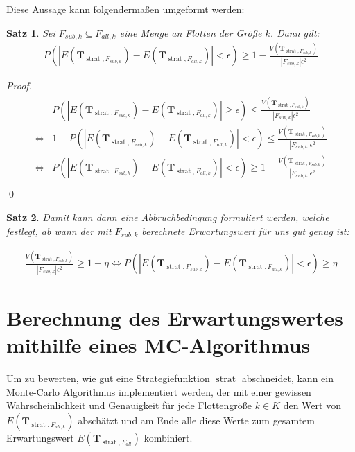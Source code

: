 \documentclass[a4paper,12pt]{llncs}
\numberwithin{equation}{section}
\newtheorem{satz}{Satz}
\DeclareMathOperator{\strat}{strat}
\begin{document}
Diese Aussage kann folgendermaßen umgeformt werden:

\begin{satz}
Sei $F_{sub,k} \subseteq F_{all,k}$ eine Menge an Flotten der Größe $k$.
Dann gilt:
\begin{align}
P(|E(\mathbf{T}_{\strat,F_{sub,k}}) - E(\mathbf{T}_{\strat,F_{all,k}})| < \epsilon) \geq 1 - \frac{V(\mathbf{T}_{\strat,F_{sub,k}})}{|F_{sub,k}| \epsilon^2}
\nonumber
\end{align}
\end{satz}

\begin{proof}
\begin{align}
\begin{split}
&P(|E(\mathbf{T}_{\strat,F_{sub,k}}) - E(\mathbf{T}_{\strat,F_{all,k}})| \geq \epsilon) \leq \frac{V(\mathbf{T}_{\strat,F_{sub,k}})}{|F_{sub,k}| \epsilon^2}\\
\Leftrightarrow &1 - P(|E(\mathbf{T}_{\strat,F_{sub,k}}) - E(\mathbf{T}_{\strat,F_{all,k}})| < \epsilon) \leq \frac{V(\mathbf{T}_{\strat,F_{sub,k}})}{|F_{sub,k}| \epsilon^2}\\
\Leftrightarrow &P(|E(\mathbf{T}_{\strat,F_{sub,k}}) - E(\mathbf{T}_{\strat,F_{all,k}})| < \epsilon) \geq 1 - \frac{V(\mathbf{T}_{\strat,F_{sub,k}})}{|F_{sub,k}| \epsilon^2}\\
\end{split}
\end{align}
\qed
\end{proof}

\begin{satz}
Damit kann dann eine Abbruchbedingung formuliert werden, welche festlegt, ab wann der mit $F_{sub,k}$ berechnete Erwartungswert für uns gut genug ist:

\begin{align}
\frac{V(\mathbf{T}_{\strat,F_{sub,k}})}{|F_{sub,k}| \epsilon^2} \geq 1 - \eta \Leftrightarrow P(|E(\mathbf{T}_{\strat,F_{sub,k}}) - E(\mathbf{T}_{\strat,F_{all,k}})| < \epsilon) \geq \eta
\nonumber
\end{align}
\end{satz}

\section{Berechnung des Erwartungswertes mithilfe eines MC-Algorithmus}

Um zu bewerten, wie gut eine Strategiefunktion $\strat$ abschneidet, kann ein Monte-Carlo Algorithmus implementiert werden, der mit einer gewissen Wahrscheinlichkeit und Genauigkeit für jede Flottengröße $k \in K$ den Wert von $E(\mathbf{T}_{\strat,F_{all,k}})$ abschätzt und am Ende alle diese Werte zum gesamtem Erwartungswert $E(\mathbf{T}_{\strat,F_{all}})$ kombiniert.
\end{document}
